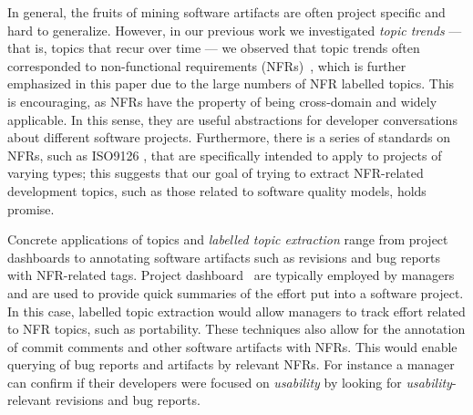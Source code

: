 \documentclass[smallextended]{svjour3}       %
\begin{document}



In general, the fruits of mining software artifacts are often project
specific and hard to generalize.  
However, in our previous work we
investigated \emph{topic trends} --- that is, topics that recur over
time --- we observed that topic trends often corresponded to
non-functional requirements (NFRs)~\cite{Hindle09ICSM}, which is
further emphasized in this paper due to the large numbers of NFR
labelled topics.  
This is encouraging, as NFRs have the property of being cross-domain
and widely applicable. 
In this sense, they are useful abstractions for developer
conversations about different software projects.  
Furthermore, there is a series of standards on NFRs, such as ISO9126 \cite{iso9126}, that are specifically intended to apply to projects of varying
types; this suggests that our goal of trying to extract NFR-related development topics, such as those related to software quality models, holds promise.

Concrete applications of topics and \emph{labelled topic extraction}
range from project dashboards to annotating software artifacts such as revisions and bug reports with
NFR-related tags.
Project dashboard~\cite{dashboard} are typically employed by managers and are used to
provide quick summaries of the effort put into a software project. In this case, 
labelled topic extraction would allow managers to track effort
related to NFR topics, such as portability.
These techniques also allow for the annotation of commit comments
 and other software artifacts with NFRs. 
This would enable querying of bug reports and artifacts by relevant NFRs. 
For instance a manager can confirm if their developers were
focused on \emph{usability} by looking for
 \emph{usability}-relevant revisions and bug reports.
\end{document}
